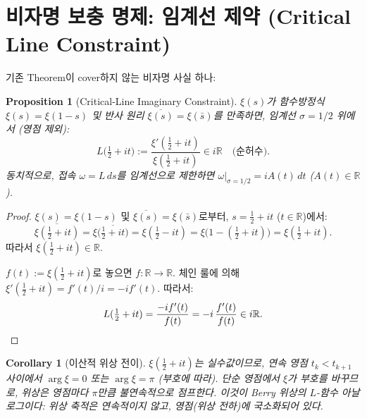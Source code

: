 \documentclass[11pt]{article}
\newtheorem{proposition}[theorem]{Proposition}
\newtheorem{corollary}[theorem]{Corollary}
\begin{document}
\section{비자명 보충 명제: 임계선 제약 (Critical Line Constraint)}

기존 Theorem이 cover하지 않는 비자명 사실 하나:

\begin{proposition}[Critical-Line Imaginary Constraint]
\label{prop:imaginary_connection}
$\xi(s)$가 함수방정식 $\xi(s) = \xi(1-s)$ 및 반사 원리 $\overline{\xi(s)} = \xi(\bar{s})$를
만족하면, 임계선 $\sigma = 1/2$ 위에서 (영점 제외):
\begin{equation}
  L\bigl(\tfrac{1}{2} + it\bigr)
  := \frac{\xi'(\tfrac{1}{2}+it)}{\xi(\tfrac{1}{2}+it)}
  \in i\mathbb{R}
  \quad\text{(순허수)}.
  \label{eq:purely_imaginary}
\end{equation}
동치적으로, 접속 $\omega = L\,ds$를 임계선으로 제한하면
$\omega|_{\sigma=1/2} = iA(t)\,dt$ ($A(t) \in \mathbb{R}$).
\end{proposition}

\begin{proof}
$\xi(s) = \xi(1-s)$ 및 $\overline{\xi(s)} = \xi(\bar{s})$로부터,
$s = \tfrac{1}{2} + it$ ($t \in \mathbb{R}$)에서:
\[
  \overline{\xi(\tfrac{1}{2}+it)}
  = \xi\bigl(\overline{\tfrac{1}{2}+it}\bigr)
  = \xi(\tfrac{1}{2} - it)
  = \xi\bigl(1 - (\tfrac{1}{2}+it)\bigr)
  = \xi(\tfrac{1}{2}+it).
\]
따라서 $\xi(\tfrac{1}{2}+it) \in \mathbb{R}$.

$f(t) := \xi(\tfrac{1}{2}+it)$로 놓으면 $f: \mathbb{R} \to \mathbb{R}$.
체인 룰에 의해 $\xi'(\tfrac{1}{2}+it) = f'(t) / i = -if'(t)$. 따라서:
\[
  L(\tfrac{1}{2}+it) = \frac{-if'(t)}{f(t)} = -i\,\frac{f'(t)}{f(t)} \in i\mathbb{R}.
  \qedhere
\]
\end{proof}

\begin{corollary}[이산적 위상 전이]
$\xi(\tfrac{1}{2}+it)$는 실수값이므로, 연속 영점 $t_k < t_{k+1}$ 사이에서
$\arg\xi = 0$ 또는 $\arg\xi = \pi$ (부호에 따라). 단순 영점에서 $\xi$가
부호를 바꾸므로, 위상은 영점마다 $\pi$만큼 불연속적으로 점프한다.
이것이 Berry 위상의 $L$-함수 아날로그이다:
위상 축적은 연속적이지 않고, 영점(위상 전하)에 국소화되어 있다.
\end{corollary}

\end{document}
